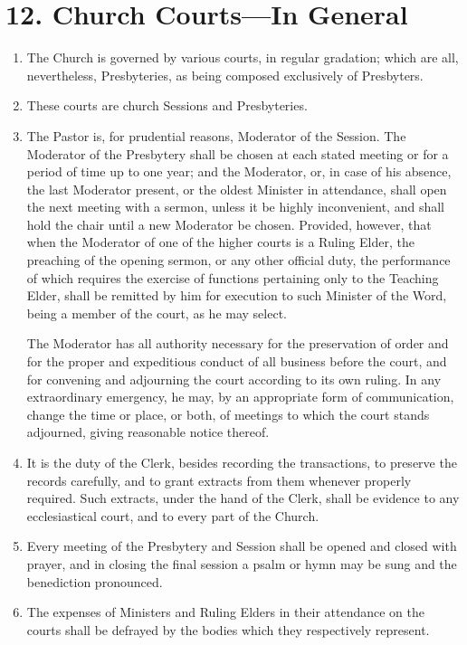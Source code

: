 \documentclass[
]{book}
\begin{document}
\hypertarget{church-courtsin-general}{%
\section*{12. Church Courts---In General}\label{church-courtsin-general}}

\protect\hypertarget{chapter-slug-12-church-courts-in-general}{\href{}{}}

\begin{enumerate}
\def\labelenumi{\arabic{enumi}.}
\item
  \protect\hypertarget{12}{\href{}{}}The Church is governed by various courts, in regular gradation; which are all, nevertheless, Presbyteries, as being composed exclusively of Presbyters.
\item
  These courts are church Sessions and Presbyteries.
\item
  The Pastor is, for prudential reasons, Moderator of the Session. The Moderator of the Presbytery shall be chosen at each stated meeting or for a period of time up to one year; and the Moderator, or, in case of his absence, the last Moderator present, or the oldest Minister in attendance, shall open the next meeting with a sermon, unless it be highly inconvenient, and shall hold the chair until a new Moderator be chosen. Provided, however, that when the Moderator of one of the higher courts is a Ruling Elder, the preaching of the opening sermon, or any other official duty, the performance of which requires the exercise of functions pertaining only to the Teaching Elder, shall be remitted by him for execution to such Minister of the Word, being a member of the court, as he may select.

  The Moderator has all authority necessary for the preservation of order and for the proper and expeditious conduct of all business before the court, and for convening and adjourning the court according to its own ruling. In any extraordinary emergency, he may, by an appropriate form of communication, change the time or place, or both, of meetings to which the court stands adjourned, giving reasonable notice thereof.
\item
  It is the duty of the Clerk, besides recording the transactions, to preserve the records carefully, and to grant extracts from them whenever properly required. Such extracts, under the hand of the Clerk, shall be evidence to any ecclesiastical court, and to every part of the Church.
\item
  Every meeting of the Presbytery and Session shall be opened and closed with prayer, and in closing the final session a psalm or hymn may be sung and the benediction pronounced.
\item
  The expenses of Ministers and Ruling Elders in their attendance on the courts shall be defrayed by the bodies which they respectively represent.
\end{enumerate}
\end{document}
